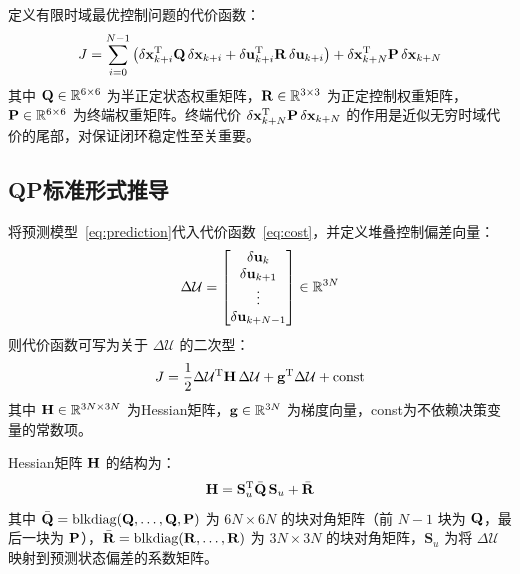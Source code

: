 定义有限时域最优控制问题的代价函数：
\begin{equation}\label{eq:cost}
J = \sum_{i=0}^{N-1} \left( \delta\mathbf{x}_{k+i}^{\mathrm{T}} \mathbf{Q}\, \delta\mathbf{x}_{k+i} + \delta\mathbf{u}_{k+i}^{\mathrm{T}} \mathbf{R}\, \delta\mathbf{u}_{k+i} \right) + \delta\mathbf{x}_{k+N}^{\mathrm{T}} \mathbf{P}\, \delta\mathbf{x}_{k+N}
\end{equation}
其中 $\mathbf{Q} \in \mathbb{R}^{6 \times 6}$ 为半正定状态权重矩阵，$\mathbf{R} \in \mathbb{R}^{3 \times 3}$ 为正定控制权重矩阵，$\mathbf{P} \in \mathbb{R}^{6 \times 6}$ 为终端权重矩阵。终端代价 $\delta\mathbf{x}_{k+N}^{\mathrm{T}} \mathbf{P}\, \delta\mathbf{x}_{k+N}$ 的作用是近似无穷时域代价的尾部，对保证闭环稳定性至关重要\cite{Mayne2000}。

\subsection{QP标准形式推导}\label{sec:qp}

将预测模型~\eqref{eq:prediction}代入代价函数~\eqref{eq:cost}，并定义堆叠控制偏差向量：
\begin{equation}
\Delta\mathcal{U} = \begin{bmatrix} \delta\mathbf{u}_{k} \\ \delta\mathbf{u}_{k+1} \\ \vdots \\ \delta\mathbf{u}_{k+N-1} \end{bmatrix} \in \mathbb{R}^{3N}
\end{equation}
则代价函数可写为关于 $\Delta\mathcal{U}$ 的二次型：
\begin{equation}\label{eq:qp_cost}
J = \frac{1}{2} \Delta\mathcal{U}^{\mathrm{T}} \mathbf{H}\, \Delta\mathcal{U} + \mathbf{g}^{\mathrm{T}} \Delta\mathcal{U} + \text{const}
\end{equation}
其中 $\mathbf{H} \in \mathbb{R}^{3N \times 3N}$ 为Hessian矩阵，$\mathbf{g} \in \mathbb{R}^{3N}$ 为梯度向量，const为不依赖决策变量的常数项。

Hessian矩阵 $\mathbf{H}$ 的结构为：
\begin{equation}\label{eq:hessian}
\mathbf{H} = \mathbf{S}_u^{\mathrm{T}} \bar{\mathbf{Q}}\, \mathbf{S}_u + \bar{\mathbf{R}}
\end{equation}
其中 $\bar{\mathbf{Q}} = \text{blkdiag}(\mathbf{Q}, \ldots, \mathbf{Q}, \mathbf{P})$ 为 $6N \times 6N$ 的块对角矩阵（前 $N\!-\!1$ 块为 $\mathbf{Q}$，最后一块为 $\mathbf{P}$），$\bar{\mathbf{R}} = \text{blkdiag}(\mathbf{R}, \ldots, \mathbf{R})$ 为 $3N \times 3N$ 的块对角矩阵，$\mathbf{S}_u$ 为将 $\Delta\mathcal{U}$ 映射到预测状态偏差的系数矩阵。

